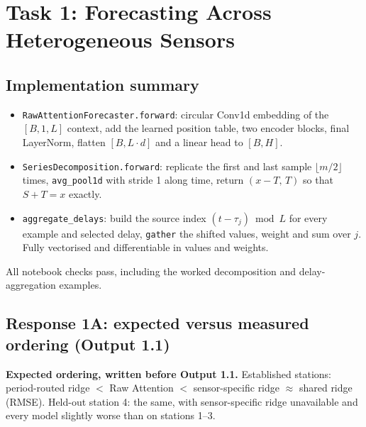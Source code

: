 \section{Task 1: Forecasting Across Heterogeneous Sensors}

\subsection*{Implementation summary}
\begin{itemize}
  \item \texttt{RawAttentionForecaster.forward}: circular Conv1d embedding of the
        $[B,1,L]$ context, add the learned position table, two encoder blocks, final
        LayerNorm, flatten $[B,L\cdot d]$ and a linear head to $[B,H]$.
  \item \texttt{SeriesDecomposition.forward}: replicate the first and last sample
        $\lfloor m/2\rfloor$ times, \texttt{avg\_pool1d} with stride 1 along time, return
        $(x-T,\,T)$ so that $S+T=x$ exactly.
  \item \texttt{aggregate\_delays}: build the source index $(t-\tau_j)\bmod L$ for every
        example and selected delay, \texttt{gather} the shifted values, weight and sum over
        $j$. Fully vectorised and differentiable in values and weights.
\end{itemize}
All notebook checks pass, including the worked decomposition and delay-aggregation examples.

\subsection*{Response 1A: expected versus measured ordering (Output 1.1)}

\textbf{Expected ordering, written before Output 1.1.}
Established stations: period-routed ridge $<$ Raw Attention $<$ sensor-specific ridge
$\approx$ shared ridge (RMSE). Held-out station 4: the same, with sensor-specific ridge
unavailable and every model slightly worse than on stations 1--3.

